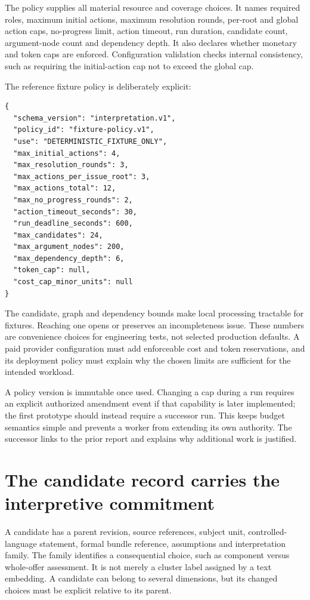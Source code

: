 \documentclass[12pt,a4paper,oneside,openany]{book}
\begin{document}
The policy supplies all material resource and coverage choices. It names required
roles, maximum initial actions, maximum resolution rounds, per-root and global
action caps, no-progress limit, action timeout, run duration, candidate count,
argument-node count and dependency depth. It also declares whether monetary and
token caps are enforced. Configuration validation checks internal consistency,
such as requiring the initial-action cap not to exceed the global cap.

The reference fixture policy is deliberately explicit:
\begin{lstlisting}[caption={Reference limits for deterministic controller fixtures.}]
{
  "schema_version": "interpretation.v1",
  "policy_id": "fixture-policy.v1",
  "use": "DETERMINISTIC_FIXTURE_ONLY",
  "max_initial_actions": 4,
  "max_resolution_rounds": 3,
  "max_actions_per_issue_root": 3,
  "max_actions_total": 12,
  "max_no_progress_rounds": 2,
  "action_timeout_seconds": 30,
  "run_deadline_seconds": 600,
  "max_candidates": 24,
  "max_argument_nodes": 200,
  "max_dependency_depth": 6,
  "token_cap": null,
  "cost_cap_minor_units": null
}
\end{lstlisting}

The candidate, graph and dependency bounds make local processing tractable for
fixtures. Reaching one opens or preserves an incompleteness issue. These numbers
are convenience choices for engineering tests, not selected production defaults.
A paid provider configuration must add enforceable cost and token reservations,
and its deployment policy must explain why the chosen limits are sufficient for
the intended workload.

A policy version is immutable once used. Changing a cap during a run requires an
explicit authorized amendment event if that capability is later implemented;
the first prototype should instead require a successor run. This keeps budget
semantics simple and prevents a worker from extending its own authority. The
successor links to the prior report and explains why additional work is justified.

\section{The candidate record carries the interpretive commitment}

A candidate has a parent revision, source references, subject unit, controlled-
language statement, formal bundle reference, assumptions and interpretation
family. The family identifies a consequential choice, such as component versus
whole-offer assessment. It is not merely a cluster label assigned by a text
embedding. A candidate can belong to several dimensions, but its changed choices
must be explicit relative to its parent.
\end{document}
